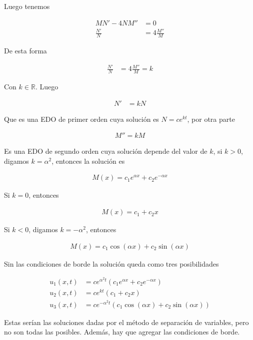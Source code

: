 \documentclass{article}
\theoremstyle{plain}
\theoremstyle{definition}
\begin{document}
Luego tenemos


\begin{align*}
    MN'-4NM'' &= 0 \\
    \frac{N'}{N} &= 4\frac{M''}{M}
\end{align*}

De esta forma

\begin{align*}
    \frac{N'}{N} &= 4\frac{M''}{M} = k
\end{align*}

Con $k \in \mathbb{R}$. Luego

\begin{align*}
   N'&=  kN
\end{align*}

Que es una EDO de primer orden cuya solución es $N = ce^{kt}$, por otra parte

\begin{align*}
    M''=kM
\end{align*}

Es una EDO de segundo orden cuya solución depende del valor de $k$, si $k>0$, digamos $k=\alpha^2$, entonces la solución es

\begin{align*}
    M(x) = c_1e^{\alpha x}+c_2e^{-\alpha x}
\end{align*}

Si $k=0$, entonces

\begin{align*}
    M(x) = c_1+c_2x
\end{align*}

Si $k<0$, digamos $k=-\alpha^2$, entonces

\begin{align*}
    M(x) = c_1\cos(\alpha x)+c_2\sin(\alpha x)
\end{align*}

Sin las condiciones de borde la solución queda como tres posibilidades

\begin{align*}
    u_1(x,t) &= ce^{\alpha^2t}(c_1e^{\alpha x}+c_2e^{-\alpha x}) \\
    u_2(x,t) &= ce^{kt}(c_1+c_2x) \\
    u_3(x,t) &= ce^{-\alpha^2t}(c_1\cos(\alpha x)+c_2\sin(\alpha x))
\end{align*}

Estas serían las soluciones dadas por el método de separación de variables, pero no son todas las posibles. Además, hay que agregar las condiciones de borde. \\
\end{document}
